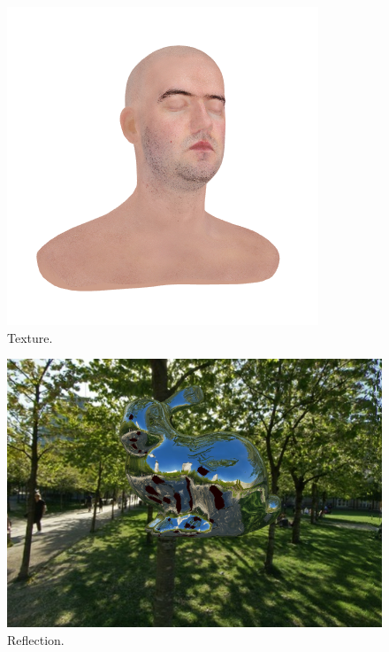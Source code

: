 \documentclass[../main.tex]{subfiles}
\begin{document}
{\begin{figure}
\centering
\includegraphics[width=\linewidth]{fig/texture.png}
\caption{Texture.}
\label{fig:texture}
\end{figure}
\begin{figure}
		\centering
		\includegraphics[width=\linewidth]{fig/reflection.png}
		\caption{Reflection.}
		\label{fig:reflection}
\end{figure}
	
}
\end{document}
